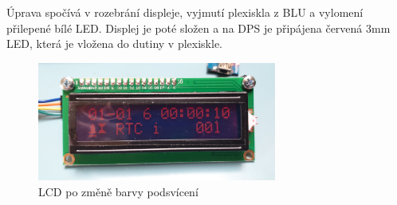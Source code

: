 Úprava spočívá v rozebrání displeje, vyjmutí plexiskla z BLU a vylomení
přilepené bílé LED. Displej je poté složen a na DPS je připájena červená
\num{3}\si{\milli\meter} LED, která je vložena do dutiny v plexiskle.

\begin{figure}[htbp]
    \centering
    \includegraphics[width=0.7\textwidth]{figures/LCD-mod-after}
    \caption{LCD po změně barvy podsvícení}
    \label{fig:LCD cervena}
\end{figure}

